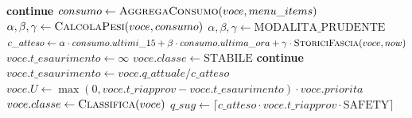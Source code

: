 \begin{algorithm}[H]
\caption{Procedura principale PredictReorder}
\label{alg:predict_reorder}
\begin{algorithmic}[1]
 
     
            \State \textbf{continue}
        \EndIf
        \State $consumo \gets \Call{AggregaConsumo}{voce, menu\_items}$ 
         
            \State $\alpha, \beta, \gamma \gets \Call{CalcolaPesi}{voce, consumo}$ 
        \Else
            \State $\alpha, \beta, \gamma \gets \text{MODALITA\_PRUDENTE}$ 
        \EndIf
        \State $c\_atteso \gets \alpha \cdot consumo.ultimi\_15 + \beta \cdot consumo.ultima\_ora + \gamma \cdot \Call{StoriciFascia}{voce, now}$ 
            \State $voce.t\_esaurimento \gets \infty$
            \State $voce.classe \gets \text{STABILE}$
            \State \textbf{continue}
        \EndIf
        \State $voce.t\_esaurimento \gets voce.q\_attuale / c\_atteso$ 
        \State $voce.U \gets \max(0, voce.t\_riapprov - voce.t\_esaurimento) \cdot voce.priorita$ 
        \State $voce.classe \gets \Call{Classifica}{voce}$ 
            \State $q\_sug \gets \lceil c\_atteso \cdot voce.t\_riapprov \cdot \text{SAFETY} \rceil$ 
            \State {} 
        \EndIf
    \EndFor
\EndProcedure
\end{algorithmic}
\end{algorithm}

